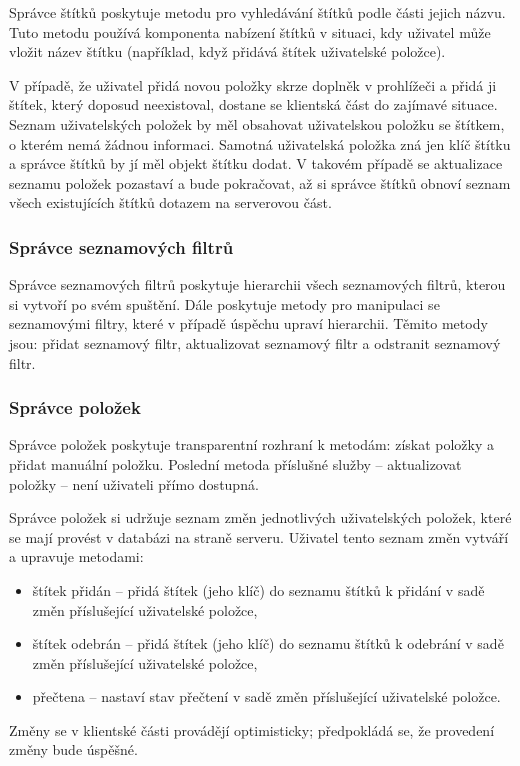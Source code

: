 Správce štítků poskytuje metodu pro vyhledávání štítků podle části jejich názvu.
Tuto metodu používá komponenta nabízení štítků v situaci, kdy uživatel může vložit název štítku (například, když přidává štítek uživatelské položce).

V případě, že uživatel přidá novou položky skrze doplněk v prohlížeči a přidá ji štítek, který doposud neexistoval, dostane se klientská část do zajímavé situace.
Seznam uživatelských položek by měl obsahovat uživatelskou položku se štítkem, o kterém nemá žádnou informaci.
Samotná uživatelská položka zná jen klíč štítku a správce štítků by jí měl objekt štítku dodat.
V takovém případě se aktualizace seznamu položek pozastaví a bude pokračovat, až si správce štítků obnoví seznam všech existujících štítků dotazem na serverovou část.

\subsubsection{Správce seznamových filtrů}

Správce seznamových filtrů poskytuje hierarchii všech seznamových filtrů, kterou si vytvoří po svém spuštění.
Dále poskytuje metody pro manipulaci se seznamovými filtry, které v případě úspěchu upraví hierarchii.
Těmito metody jsou: přidat seznamový filtr, aktualizovat seznamový filtr a odstranit seznamový filtr.

\subsubsection{Správce položek}

Správce položek poskytuje transparentní rozhraní k metodám: získat položky a přidat manuální položku.
Poslední metoda příslušné služby – aktualizovat položky – není uživateli přímo dostupná.

Správce položek si udržuje seznam změn jednotlivých uživatelských položek, které se mají provést v databázi na straně serveru.
Uživatel tento seznam změn vytváří a upravuje metodami:
\begin{itemize}
	\item štítek přidán -- přidá štítek (jeho klíč) do seznamu štítků k přidání v sadě změn příslušející uživatelské položce,
	\item štítek odebrán -- přidá štítek (jeho klíč) do seznamu štítků k odebrání v sadě změn příslušející uživatelské položce,
	\item přečtena -- nastaví stav přečtení v sadě změn příslušející uživatelské položce.
\end{itemize}
Změny se v klientské části provádějí optimisticky; předpokládá se, že provedení změny bude úspěšné.


